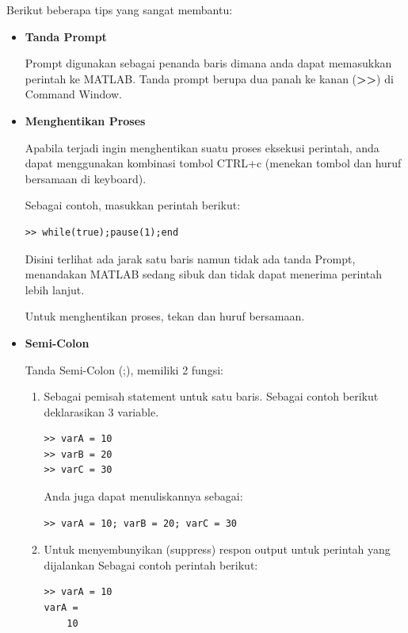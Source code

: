 \documentclass[12pt]{book}
\begin{document}
	Berikut beberapa tips yang sangat membantu:

	\begin{itemize}
		\item \textbf{Tanda Prompt}

		Prompt digunakan sebagai penanda baris dimana anda dapat memasukkan perintah ke MATLAB.
		Tanda prompt berupa dua panah ke kanan (\textbf{>>}) di Command Window.

		\item \textbf{Menghentikan Proses}

		Apabila terjadi ingin menghentikan suatu proses eksekusi perintah,
		anda dapat menggunakan kombinasi tombol CTRL+c (menekan tombol  dan huruf  bersamaan di keyboard).

		Sebagai contoh, masukkan perintah berikut:
		\begin{verbatim}
>> while(true);pause(1);end
		\end{verbatim}

		Disini terlihat ada jarak satu baris namun tidak ada tanda Prompt,
		menandakan MATLAB sedang sibuk dan tidak dapat menerima perintah lebih lanjut.

		Untuk menghentikan proses, tekan  dan huruf  bersamaan.

		\item \textbf{Semi-Colon}

		Tanda Semi-Colon (;), memiliki 2 fungsi:
		\begin{enumerate}
			\item Sebagai pemisah statement untuk satu baris.
			Sebagai contoh berikut deklarasikan 3 variable.
			\begin{verbatim}
>> varA = 10
>> varB = 20
>> varC = 30
			\end{verbatim}

			Anda juga dapat menuliskannya sebagai:
			\begin{verbatim}
>> varA = 10; varB = 20; varC = 30
			\end{verbatim}

			\item Untuk menyembunyikan (suppress) respon output untuk perintah yang dijalankan
			Sebagai contoh perintah berikut:
			\begin{verbatim}
>> varA = 10
varA =
	10
			\end{verbatim}


\end{enumerate}
\end{itemize}
\end{document}
